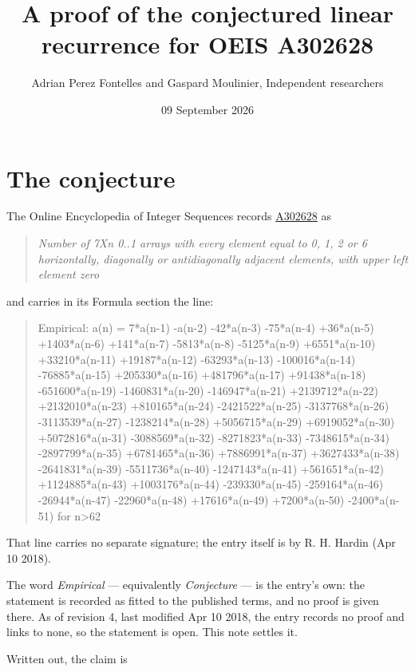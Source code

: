 \documentclass[11pt]{article}
\title{A proof of the conjectured linear recurrence for OEIS A302628}
\author{Adrian Perez Fontelles and Gaspard Moulinier, Independent researchers}
\date{09 September 2026}
\theoremstyle{definition}
\begin{document}
\maketitle
\section{The conjecture}

The Online Encyclopedia of Integer Sequences records \href{https://oeis.org/A302628}{A302628} as

\begin{quote}\itshape Number of 7Xn 0..1 arrays with every element equal to 0, 1, 2 or 6 horizontally, diagonally or antidiagonally adjacent elements, with upper left element zero\end{quote}

and carries in its Formula section the line:

\begin{quote}\ttfamily Empirical: a(n) = 7*a(n-1) -a(n-2) -42*a(n-3) -75*a(n-4) +36*a(n-5) +1403*a(n-6) +141*a(n-7) -5813*a(n-8) -5125*a(n-9) +6551*a(n-10) +33210*a(n-11) +19187*a(n-12) -63293*a(n-13) -100016*a(n-14) -76885*a(n-15) +205330*a(n-16) +481796*a(n-17) +91438*a(n-18) -651600*a(n-19) -1460831*a(n-20) -146947*a(n-21) +2139712*a(n-22) +2132010*a(n-23) +810165*a(n-24) -2421522*a(n-25) -3137768*a(n-26) -3113539*a(n-27) -1238214*a(n-28) +5056715*a(n-29) +6919052*a(n-30) +5072816*a(n-31) -3088569*a(n-32) -8271823*a(n-33) -7348615*a(n-34) -2897799*a(n-35) +6781465*a(n-36) +7886991*a(n-37) +3627433*a(n-38) -2641831*a(n-39) -5511736*a(n-40) -1247143*a(n-41) +561651*a(n-42) +1124885*a(n-43) +1003176*a(n-44) -239330*a(n-45) -259164*a(n-46) -26944*a(n-47) -22960*a(n-48) +17616*a(n-49) +7200*a(n-50) -2400*a(n-51) for n>62\end{quote}

That line carries no separate signature; the entry itself is by R. H. Hardin (Apr 10 2018).

The word {\itshape Empirical} --- equivalently {\itshape Conjecture} --- is the entry's own: the statement is recorded as fitted to the published terms, and no proof is given there. As of revision 4, last modified Apr 10 2018, the entry records no proof and links to none, so the statement is open. This note settles it.

Written out, the claim is
\end{document}
